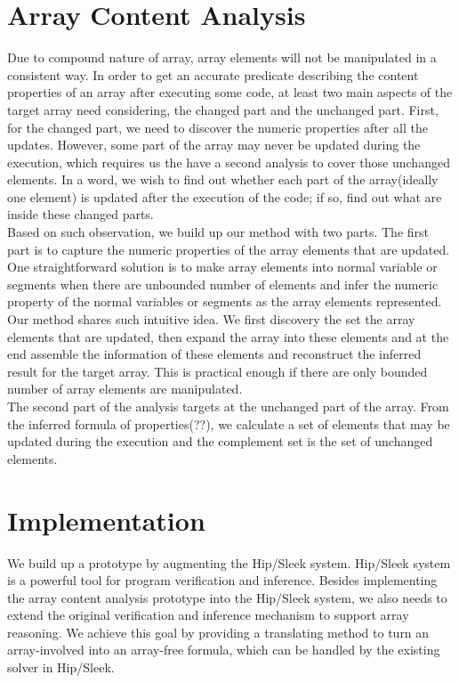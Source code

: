 \documentclass[]{article}
\begin{document}
\section{Array Content Analysis}
Due to compound nature of array, array elements will not be manipulated in a consistent way. In order to get an accurate predicate describing the content properties of an array after executing some code, at least two main aspects of the target array need considering, the changed part and the unchanged part. First, for the changed part, we need to discover the numeric properties after all the updates. However, some part of the array may never be updated during the execution, which requires us the have a second analysis to cover those unchanged elements. In a word, we wish to find out whether each part of the array(ideally one element) is updated after the execution of the code; if so, find out what are inside these changed parts.\\

Based on such observation, we build up our method with two parts. The first part is to capture the numeric properties of the array elements that are updated. One straightforward solution is to make array elements into normal variable or segments when there are unbounded number of elements and infer the numeric property of the normal variables or segments as the array elements represented. Our method shares such intuitive idea. We first discovery the set the array elements that are updated, then expand the array into these elements and at the end assemble the information of these elements and reconstruct the inferred result for the target array. This is practical enough if there are only bounded number of array elements are manipulated.\\

The second part of the analysis targets at the unchanged part of the array. From the inferred formula of properties(??), we calculate a set of elements that may be updated during the execution and the complement set is the set of unchanged elements.\\

\section{Implementation}
We build up a prototype by augmenting the Hip/Sleek system. Hip/Sleek system is a powerful tool for program verification and inference. Besides implementing the array content analysis prototype into the Hip/Sleek system, we also needs to extend the original verification and inference mechanism to support array reasoning. We achieve this goal by providing a translating method to turn an array-involved into an array-free formula, which can be handled by the existing solver in Hip/Sleek.
\end{document}
